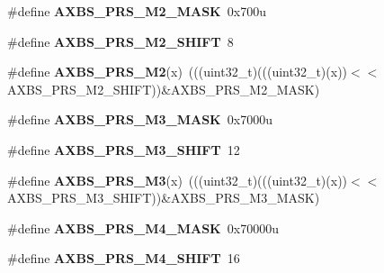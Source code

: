 \begin{DoxyCompactItemize}
\item 
\#define {\bfseries A\+X\+B\+S\+\_\+\+P\+R\+S\+\_\+\+M2\+\_\+\+M\+A\+SK}~0x700u\hypertarget{group__AXBS__Register__Masks_gacd2feac8facc9d0b21f438eef172fd81}{}\label{group__AXBS__Register__Masks_gacd2feac8facc9d0b21f438eef172fd81}

\item 
\#define {\bfseries A\+X\+B\+S\+\_\+\+P\+R\+S\+\_\+\+M2\+\_\+\+S\+H\+I\+FT}~8\hypertarget{group__AXBS__Register__Masks_gacf78955a5852e31c71c1542d873df6b3}{}\label{group__AXBS__Register__Masks_gacf78955a5852e31c71c1542d873df6b3}

\item 
\#define {\bfseries A\+X\+B\+S\+\_\+\+P\+R\+S\+\_\+\+M2}(x)~(((uint32\+\_\+t)(((uint32\+\_\+t)(x))$<$$<$A\+X\+B\+S\+\_\+\+P\+R\+S\+\_\+\+M2\+\_\+\+S\+H\+I\+FT))\&A\+X\+B\+S\+\_\+\+P\+R\+S\+\_\+\+M2\+\_\+\+M\+A\+SK)\hypertarget{group__AXBS__Register__Masks_gadd7d2a1cebd1400511024fb5bbae6738}{}\label{group__AXBS__Register__Masks_gadd7d2a1cebd1400511024fb5bbae6738}

\item 
\#define {\bfseries A\+X\+B\+S\+\_\+\+P\+R\+S\+\_\+\+M3\+\_\+\+M\+A\+SK}~0x7000u\hypertarget{group__AXBS__Register__Masks_gab4b4274fe732ec08377a17c98fcb3c89}{}\label{group__AXBS__Register__Masks_gab4b4274fe732ec08377a17c98fcb3c89}

\item 
\#define {\bfseries A\+X\+B\+S\+\_\+\+P\+R\+S\+\_\+\+M3\+\_\+\+S\+H\+I\+FT}~12\hypertarget{group__AXBS__Register__Masks_gaf63a98f7cff8ba76061096736d5fa14e}{}\label{group__AXBS__Register__Masks_gaf63a98f7cff8ba76061096736d5fa14e}

\item 
\#define {\bfseries A\+X\+B\+S\+\_\+\+P\+R\+S\+\_\+\+M3}(x)~(((uint32\+\_\+t)(((uint32\+\_\+t)(x))$<$$<$A\+X\+B\+S\+\_\+\+P\+R\+S\+\_\+\+M3\+\_\+\+S\+H\+I\+FT))\&A\+X\+B\+S\+\_\+\+P\+R\+S\+\_\+\+M3\+\_\+\+M\+A\+SK)\hypertarget{group__AXBS__Register__Masks_ga4bfe54e316bfb646da18888894d3bf53}{}\label{group__AXBS__Register__Masks_ga4bfe54e316bfb646da18888894d3bf53}

\item 
\#define {\bfseries A\+X\+B\+S\+\_\+\+P\+R\+S\+\_\+\+M4\+\_\+\+M\+A\+SK}~0x70000u\hypertarget{group__AXBS__Register__Masks_ga489c3dd8930bf3ada2f36146c4e3bc61}{}\label{group__AXBS__Register__Masks_ga489c3dd8930bf3ada2f36146c4e3bc61}

\item 
\#define {\bfseries A\+X\+B\+S\+\_\+\+P\+R\+S\+\_\+\+M4\+\_\+\+S\+H\+I\+FT}~16\hypertarget{group__AXBS__Register__Masks_gaa5c41d2e8da4620d83b63f9ffb3878cd}{}\label{group__AXBS__Register__Masks_gaa5c41d2e8da4620d83b63f9ffb3878cd}


\end{DoxyCompactItemize}
